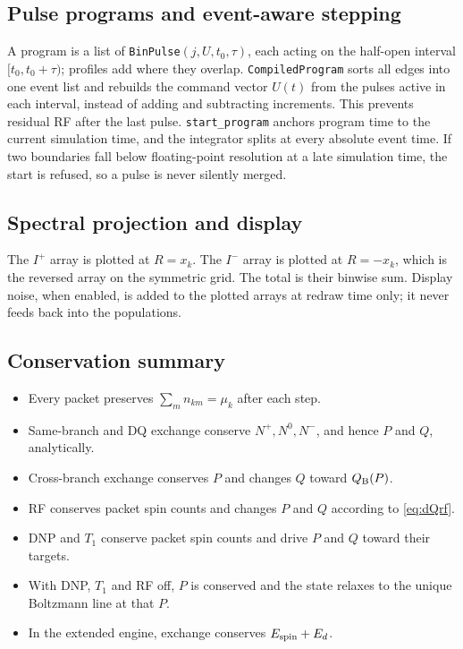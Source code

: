 \documentclass[11pt]{article}
\newcommand{\Iplus}{I^{+}}
\newcommand{\Iminus}{I^{-}}
\newcommand{\code}[1]{\texttt{#1}}
\begin{document}
\subsection{Pulse programs and event-aware stepping}

A program is a list of \code{BinPulse}\((j,U,t_0,\tau)\), each acting on the half-open interval
\([t_0,t_0+\tau)\); profiles add where they overlap. \code{CompiledProgram} sorts all edges into
one event list and rebuilds the command vector \(U(t)\) from the pulses active in each interval,
instead of adding and subtracting increments. This prevents residual RF after the last pulse.
\code{start\_program} anchors program time to the current simulation time, and the integrator
splits at every absolute event time. If two boundaries fall below floating-point resolution at a
late simulation time, the start is refused, so a pulse is never silently merged.

\subsection{Spectral projection and display}

The \(\Iplus\) array is plotted at \(R=x_k\). The \(\Iminus\) array is plotted at \(R=-x_k\),
which is the reversed array on the symmetric grid. The total is their binwise sum. Display noise,
when enabled, is added to the plotted arrays at redraw time only; it never feeds back into the
populations.

\subsection{Conservation summary}

\begin{itemize}
  \item Every packet preserves \(\sum_mn_{km}=\mu_k\) after each step.
  \item Same-branch and DQ exchange conserve \(N^+,N^0,N^-\), and hence \(P\) and \(Q\),
  analytically.
  \item Cross-branch exchange conserves \(P\) and changes \(Q\) toward \(Q_{\rm B}(P)\).
  \item RF conserves packet spin counts and changes \(P\) and \(Q\) according to
  \cref{eq:dQrf}.
  \item DNP and \(T_1\) conserve packet spin counts and drive \(P\) and \(Q\) toward their
  targets.
  \item With DNP, \(T_1\) and RF off, \(P\) is conserved and the state relaxes to the unique
  Boltzmann line at that \(P\).
  \item In the extended engine, exchange conserves \(E_{\rm spin}+E_d\).
\end{itemize}
\end{document}
